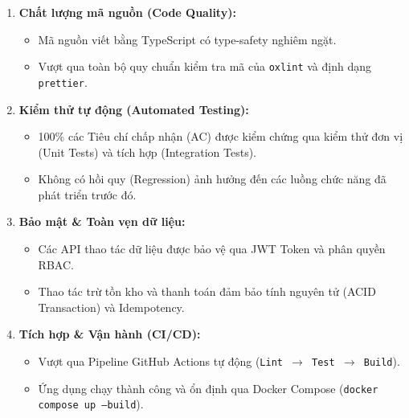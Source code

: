 \documentclass[12pt,a4paper]{article}
\begin{document}
\begin{enumerate}
    \item \textbf{Chất lượng mã nguồn (Code Quality):}
    \begin{itemize}[noitemsep]
        \item Mã nguồn viết bằng TypeScript có type-safety nghiêm ngặt.
        \item Vượt qua toàn bộ quy chuẩn kiểm tra mã của \texttt{oxlint} và định dạng \texttt{prettier}.
    \end{itemize}
    \item \textbf{Kiểm thử tự động (Automated Testing):}
    \begin{itemize}[noitemsep]
        \item 100\% các Tiêu chí chấp nhận (AC) được kiểm chứng qua kiểm thử đơn vị (Unit Tests) và tích hợp (Integration Tests).
        \item Không có hồi quy (Regression) ảnh hưởng đến các luồng chức năng đã phát triển trước đó.
    \end{itemize}
    \item \textbf{Bảo mật \& Toàn vẹn dữ liệu:}
    \begin{itemize}[noitemsep]
        \item Các API thao tác dữ liệu được bảo vệ qua JWT Token và phân quyền RBAC.
        \item Thao tác trừ tồn kho và thanh toán đảm bảo tính nguyên tử (ACID Transaction) và Idempotency.
    \end{itemize}
    \item \textbf{Tích hợp \& Vận hành (CI/CD):}
    \begin{itemize}[noitemsep]
        \item Vượt qua Pipeline GitHub Actions tự động (\texttt{Lint $\rightarrow$ Test $\rightarrow$ Build}).
        \item Ứng dụng chạy thành công và ổn định qua Docker Compose (\texttt{docker compose up --build}).
    \end{itemize}
\end{enumerate}
\end{document}
